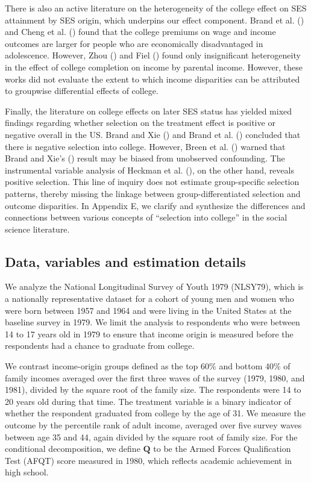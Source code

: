 \documentclass[12pt,a4paper]{article}
\def\Q{{\boldsymbol Q}}
\begin{document}
There is also an active literature on the heterogeneity of the college effect on SES attainment by SES origin, which underpins our effect component. Brand et al. (\citeyear{brand_uncovering_2021}) and Cheng et al. (\citeyear{cheng_heterogeneous_2021}) found that the college premiums on wage and income outcomes are larger for people who are economically disadvantaged in adolescence. However, Zhou (\citeyear{zhou_equalization_2019}) and Fiel (\citeyear{fiel_great_2020}) found only insignificant heterogeneity in the effect of college completion on income by parental income. However, these works did not evaluate the extent to which income disparities can be attributed to groupwise differential effects of college.

Finally, the literature on college effects on later SES status has yielded mixed findings regarding whether selection on the treatment effect is positive or negative overall in the US. Brand and Xie (\citeyear{brand_who_2010}) and Brand et al. (\citeyear{brand_uncovering_2021}) concluded that there is negative selection into college. However, Breen et al. (\citeyear{breen_heterogeneous_2015}) warned that Brand and Xie's (\citeyear{brand_who_2010}) result may be biased from unobserved confounding. The instrumental variable analysis of Heckman et al. (\citeyear{heckman_returns_2018}), on the other hand, reveals positive selection. This line of inquiry does not estimate group-specific selection patterns, thereby missing the linkage between group-differentiated selection and outcome disparities. In Appendix E, we clarify and synthesize the differences and connections between various concepts of ``selection into college'' in the social science literature. 

\subsection{Data, variables and estimation details}
We analyze the National Longitudinal Survey of Youth 1979 (NLSY79), which is a nationally representative dataset for a cohort of young men and women who were born between 1957 and 1964 and were living in the United States at the baseline survey in 1979.
We  limit the analysis to respondents who were between 14 to 17 years old in 1979 to ensure that income origin is measured before the respondents had a chance to graduate from college. 

We contrast income-origin groups defined as the top 60\% and bottom 40\% of family incomes averaged over the first three waves of the survey (1979, 1980, and 1981), divided by the square root of the family size. The respondents were 14 to 20 years old during that time. The treatment variable is a binary indicator of whether the respondent graduated from college by the age of 31. We measure the outcome by the percentile rank of adult income, averaged over five survey waves between age 35 and 44, again divided by the square root of family size. For the conditional decomposition, we define $\Q$ to be the Armed Forces Qualification Test (AFQT) score measured in 1980, which reflects academic achievement in high school. 
\end{document}
